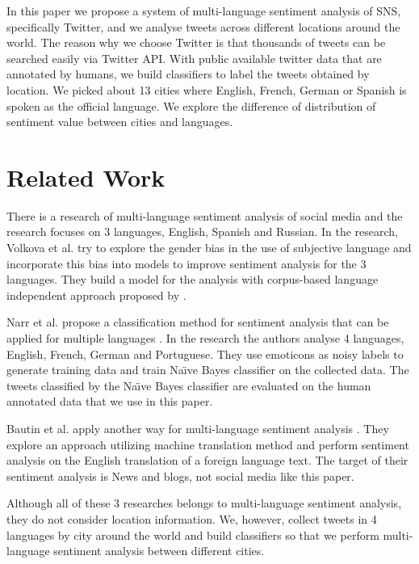 \documentclass[twocolumn]{article}
\begin{document}
In this paper we propose a system of multi-language sentiment analysis of SNS, specifically Twitter, and we analyse tweets across different locations around the world.
The reason why we choose Twitter is that thousands of tweets can be searched easily via Twitter API.
With public available twitter data that are annotated by humans, we build classifiers to label the tweets obtained by location.
We picked about 13 cities where English, French, German or Spanish is spoken as the official language.
We explore the difference of distribution of sentiment value between cities and languages.

\vspace{-6mm}

\section{Related Work}
\vspace{-2mm}
There is a research of multi-language sentiment analysis of social media \cite{related_work1} and the research focuses on 3 languages, English, Spanish and Russian.
In the research, Volkova et al. try to explore the gender bias in the use of subjective language and incorporate this bias into models to improve sentiment analysis for the 3 languages.
They build a model for the analysis with corpus-based language independent approach proposed by \cite{twitter_lexicon}.  

Narr et al. propose a classification method for sentiment analysis that can be applied for multiple languages \cite{dataset}.
In the research the authors analyse 4 languages, English, French, German and Portuguese.
They use emoticons as noisy labels to generate training data and train Na\"\i ve Bayes classifier on the collected data.
The tweets classified by the Na\"\i ve Bayes classifier are evaluated on the human annotated data that we use in this paper.

Bautin et al. apply another way for multi-language sentiment analysis \cite{related_work3}.
They explore an approach utilizing machine translation method and perform sentiment analysis on the English translation of a foreign language text.
The target of their sentiment analysis is News and blogs, not social media like this paper.

Although all of these 3 researches belongs to multi-language sentiment analysis, they do not consider location information.
We, however, collect tweets in 4 languages by city around the world and build classifiers so that we perform multi-language sentiment analysis between different cities.
\end{document}
